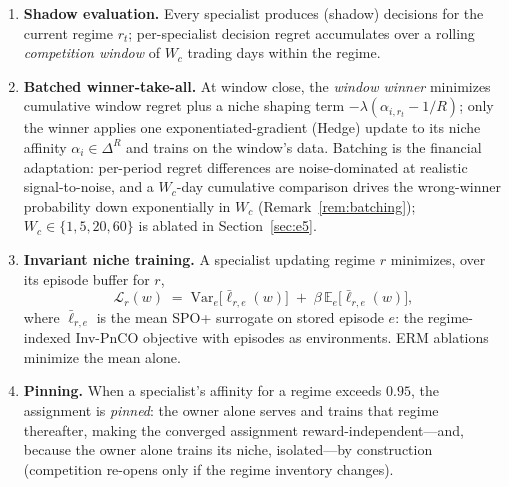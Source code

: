 \documentclass{article}
\newcommand{\E}{\mathbb{E}}
\newcommand{\Var}{\mathrm{Var}}
\begin{document}
\begin{enumerate}
    \item \textbf{Shadow evaluation.} Every specialist produces (shadow)
    decisions for the current regime $r_t$; per-specialist decision regret
    accumulates over a rolling \emph{competition window} of $W_c$ trading
    days within the regime.
    \item \textbf{Batched winner-take-all.} At window close, the
    \emph{window winner} minimizes cumulative window regret plus a niche
    shaping term $-\lambda(\alpha_{i, r_t} - 1/R)$; only the winner applies
    one exponentiated-gradient (Hedge) update to its niche affinity
    $\alpha_i \in \Delta^R$ \citep{kivinen1997exponentiated,
    freund1997decision} and trains on the window's data. Batching is the
    financial adaptation: per-period regret differences are noise-dominated
    at realistic signal-to-noise, and a $W_c$-day cumulative comparison
    drives the wrong-winner probability down exponentially in $W_c$
    (Remark~\ref{rem:batching}); $W_c \in \{1, 5, 20, 60\}$ is ablated in
    Section~\ref{sec:e5}.
    \item \textbf{Invariant niche training.} A specialist updating regime
    $r$ minimizes, over its episode buffer for $r$,
    \begin{equation}
    \label{eq:invloss}
        \mathcal{L}_r(w) \;=\; \Var_{e}\!\big[\bar\ell_{r,e}(w)\big]
        \;+\; \beta\, \E_{e}\!\big[\bar\ell_{r,e}(w)\big],
    \end{equation}
    where $\bar\ell_{r,e}$ is the mean SPO+ surrogate on stored episode $e$:
    the regime-indexed Inv-PnCO objective \citep{yan2026invpnco,
    krueger2021rex} with episodes as environments. ERM ablations minimize
    the mean alone.
    \item \textbf{Pinning.} When a specialist's affinity for a regime
    exceeds $0.95$, the assignment is \emph{pinned}: the owner alone serves
    and trains that regime thereafter, making the converged assignment
    reward-independent---and, because the owner alone trains its niche,
    isolated---by construction (competition re-opens only if the
    regime inventory changes).
\end{enumerate}
\end{document}

